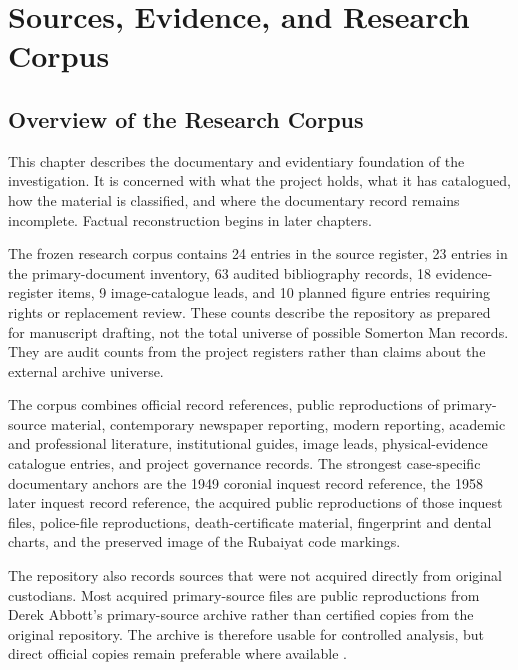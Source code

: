 \chapter{Sources, Evidence, and Research Corpus}
\label{chap:sources-evidence}


\section{Overview of the Research Corpus}

This chapter describes the documentary and evidentiary foundation of the investigation. It is concerned with what the project holds, what it has catalogued, how the material is classified, and where the documentary record remains incomplete. Factual reconstruction begins in later chapters.

The frozen research corpus contains 24 entries in the source register, 23 entries in the primary-document inventory, 63 audited bibliography records, 18 evidence-register items, 9 image-catalogue leads, and 10 planned figure entries requiring rights or replacement review. These counts describe the repository as prepared for manuscript drafting, not the total universe of possible Somerton Man records. They are audit counts from the project registers rather than claims about the external archive universe.

The corpus combines official record references, public reproductions of primary-source material, contemporary newspaper reporting, modern reporting, academic and professional literature, institutional guides, image leads, physical-evidence catalogue entries, and project governance records. The strongest case-specific documentary anchors are the 1949 coronial inquest record reference, the 1958 later inquest record reference, the acquired public reproductions of those inquest files, police-file reproductions, death-certificate material, fingerprint and dental charts, and the preserved image of the Rubaiyat code markings.

The repository also records sources that were not acquired directly from original custodians. Most acquired primary-source files are public reproductions from Derek Abbott's primary-source archive rather than certified copies from the original repository. The archive is therefore usable for controlled analysis, but direct official copies remain preferable where available \parencite{src-src-0005}.

